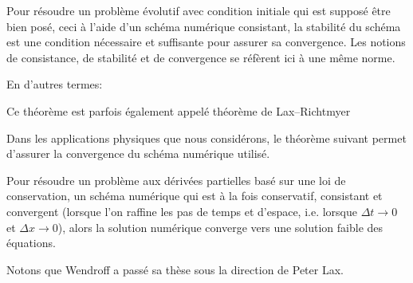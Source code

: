 \begin{theoreme}
Pour résoudre un problème évolutif avec condition initiale qui est supposé être bien posé, ceci à l'aide d'un schéma numérique
consistant, la stabilité du schéma est une condition nécessaire et suffisante pour assurer sa convergence.
Les notions de consistance, de stabilité et de convergence se réfèrent ici à une même norme.

En d'autres termes: 
\end{theoreme}
Ce théorème est parfois également appelé théorème de Lax–Richtmyer

\medskip
Dans les applications physiques que nous considérons, le théorème suivant permet d'assurer la convergence du
schéma numérique utilisé.
\begin{theoreme}
Pour résoudre un problème aux dérivées partielles basé sur une loi de conservation, un schéma numérique qui est à la fois conservatif,
consistant et convergent (lorsque l'on raffine les pas de temps et d'espace, i.e. lorsque $\Delta t \rightarrow 0$ et $\Delta x \rightarrow 0$),
alors la solution numérique converge vers une solution faible des équations.
\end{theoreme}

Notons que Wendroff a passé sa thèse sous la direction de Peter Lax.

